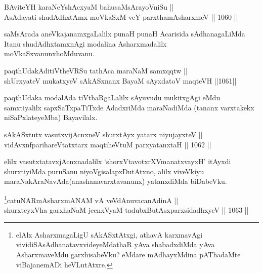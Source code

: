 
\begin{shl}
BAviteYH karaNeYshAcxyaM bahusaMsArayoVniSu || \\
AsAdayati shudAdhxtAmx moVkaSxM veY parxthamAsharxmeV \hfill || 1060 ||  
\end{shl}

\begin{artha}
saMsArada aneVkajanamxgaLalilx punaH punaH Acarisida sAdhanagaLiMda Itanu shudAdhxtamxnAgi modalina Asharxmadalilx moVkaSxvanunx\break hoMduvanu.
\end{artha}


\begin{shl}
paqthUdakAditiVtheVRSu tathAca maraNaM samxqqtw || \\
shUrxyateV mukatxyeV sAkASxnanx BayaM sAyxdatoV maqteVH \hfill ||1061||  
\end{shl}

\begin{artha}
paqthUdaka modalAda tiVthaRgaLalilx sAyuvudu mukitxgAgi eMdu samxtiyalilx sapxSaTxpaTiTxde AdadxriMda maraNadiMda (tananx varxtakekx niSaPxlateyeMba) Bayavilalx.
\end{artha}

\begin{shl}
sAkASxtutx vasutxvijAcnxneV shurxtAyx yatarx niyujayxteV || \\
vidAvxnfparihareVtatxtarx maqtiheVtuM parxyatanxtaH \hfill || 1062 ||  
\end{shl}

\begin{artha}
elilx vasutxtatavxjAcnxnadalilx `shorxVtavotxrXVmanatxvayxH' itAyxdi shurxtiyiMda puruSanu niyoVgisalapxDutAtxno, alilx viveVkiyu maraNakAraNavAda(anashanavarxtavanunx) yatanxdiMda biDabeVku.
\end{artha}


\begin{shl}
\footnote{elAlx AsharxmagaLigU sAkASxtAtxgi, athavA karxmavAgi vividiSAsAdhanatavxvideyeMdathaR yAva shabadxdiMda yAva AsharxmaveMdu garxhisabeVku? eMdare mAdhayxMdina pAThadaMte viBajanemADi heVLutAtxre.}catuNARmAsharxmANAM vA veVdAnuvacanAdinA || \\
shurxteyxVha garxhaNaM jecnxVyaM tadubxButAsxparxsidadhxyeV \hfill || 1063 ||  
\end{shl}

